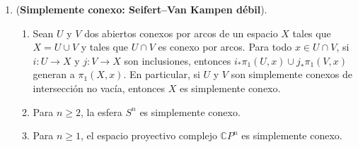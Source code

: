 \documentclass[11pt,a4paper]{article}
\theoremstyle{plain}
\theoremstyle{definition}
\theoremstyle{remark}
\newcommand{\CC}{\mathbb C}
\begin{document}
\begin{enumerate}[label=\arabic*.,leftmargin=*]
\item (\textbf{Simplemente conexo: Seifert--Van Kampen débil}).
\begin{enumerate}[label=\alph*)]
\item Sean $U$ y $V$ dos abiertos conexos por arcos de un espacio $X$ tales
que $X=U\cup V$ y tales que $U\cap V$ es conexo por arcos. Para todo
$x\in U\cap V$, si $i:U\to X$ y $j:V\to X$ son inclusiones, entonces
$i_*\pi_1(U,x)\cup j_*\pi_1(V,x)$ generan a $\pi_1(X,x)$. En particular, si
$U$ y $V$ son simplemente conexos de intersección no vacía, entonces $X$ es
simplemente conexo.
\item Para $n\ge2$, la esfera $S^n$ es simplemente conexo.
\item Para $n\ge1$, el espacio proyectivo complejo $\CC P^n$ es simplemente
conexo.
\end{enumerate}


\end{enumerate}
\end{document}
